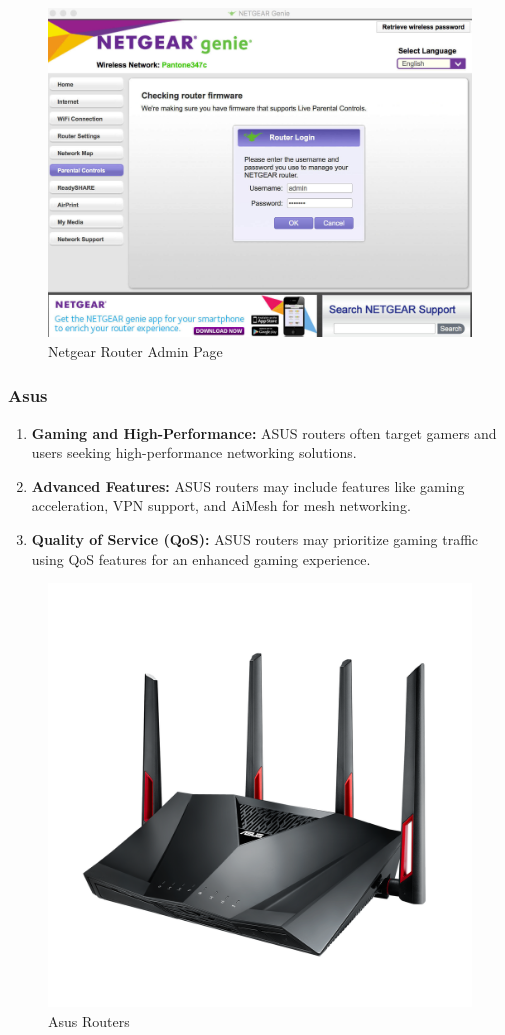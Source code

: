 \documentclass[11pt]{article}
\begin{document}
\begin{figure}[H]
  \centering
  \includegraphics[width=.95\textwidth]{netgear routers admin page/netgear routers admin page_0.jpg}
  \caption{Netgear Router Admin Page}
\end{figure}
\subsubsection{Asus}
\begin{enumerate}
  \item \textbf{Gaming and High-Performance:} ASUS routers often target gamers and users seeking high-performance networking solutions.

  \item \textbf{Advanced Features:} ASUS routers may include features like gaming acceleration, VPN support, and AiMesh for mesh networking.

  \item \textbf{Quality of Service (QoS):} ASUS routers may prioritize gaming traffic using QoS features for an enhanced gaming experience.
\end{enumerate}

\begin{figure}[H]
  \centering
  \includegraphics[width=.45\textwidth]{asus routers/asus routers_3.jpg}
  \caption{Asus Routers}
\end{figure}
\end{document}
